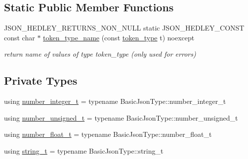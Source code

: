 \subsection*{Static Public Member Functions}
\begin{DoxyCompactItemize}
\item 
J\+S\+O\+N\+\_\+\+H\+E\+D\+L\+E\+Y\+\_\+\+R\+E\+T\+U\+R\+N\+S\+\_\+\+N\+O\+N\+\_\+\+N\+U\+LL static J\+S\+O\+N\+\_\+\+H\+E\+D\+L\+E\+Y\+\_\+\+C\+O\+N\+ST const char $\ast$ \hyperlink{classnlohmann_1_1detail_1_1lexer_adb831e1f692a45c2281ed3d59ddf1e17}{token\+\_\+type\+\_\+name} (const \hyperlink{classnlohmann_1_1detail_1_1lexer_a3f313cdbe187cababfc5e06f0b69b098}{token\+\_\+type} t) noexcept
\begin{DoxyCompactList}\small\item\em return name of values of type token\+\_\+type (only used for errors) \end{DoxyCompactList}\end{DoxyCompactItemize}
\subsection*{Private Types}
\begin{DoxyCompactItemize}
\item 
using \hyperlink{classnlohmann_1_1detail_1_1lexer_a9cd1b11cc67edbfb2613c788b5bd337c}{number\+\_\+integer\+\_\+t} = typename Basic\+Json\+Type\+::number\+\_\+integer\+\_\+t
\item 
using \hyperlink{classnlohmann_1_1detail_1_1lexer_a105d1dfeab414a572655895cdd96a52a}{number\+\_\+unsigned\+\_\+t} = typename Basic\+Json\+Type\+::number\+\_\+unsigned\+\_\+t
\item 
using \hyperlink{classnlohmann_1_1detail_1_1lexer_aa7f9e7b2bcd311fb86e2da43761a6619}{number\+\_\+float\+\_\+t} = typename Basic\+Json\+Type\+::number\+\_\+float\+\_\+t
\item 
using \hyperlink{classnlohmann_1_1detail_1_1lexer_ab63d35c658887592a4b09ad26eb4c795}{string\+\_\+t} = typename Basic\+Json\+Type\+::string\+\_\+t
\end{DoxyCompactItemize}
